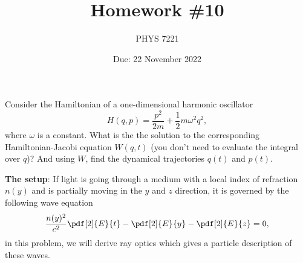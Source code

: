 \documentclass{jhwhw}
\author{PHYS 7221}
\title{Homework \#10}
\date{Due: 22 November 2022}
\begin{document}

Consider the Hamiltonian of a one-dimensional harmonic oscillator
\begin{equation}
  \label{eq:5}
  H(q,p) = \frac{p^{2}}{2m} + \frac12 m \omega^{2} q^{2},
\end{equation}
where $\omega$ is a constant.
What is the the solution to the corresponding Hamiltonian-Jacobi equation $W(q,t)$ (you don't need to evaluate the integral over $q$)?
And using $W$, find the dynamical trajectories $q(t)$ and $p(t)$.



{\bf The setup}: If light is going through a medium with a local index of refraction $n(y)$ and is partially moving in the $y$ and $z$ direction, it is governed by the following wave equation
\begin{equation}
  \label{eq:1}
  \frac{n(y)^{2}}{c^{2}}\pdf[2]{E}{t} - \pdf[2]{E}{y} - \pdf[2]{E}{z} = 0,
\end{equation}
in this problem, we will derive ray optics which gives a particle description of these waves.
\end{document}
